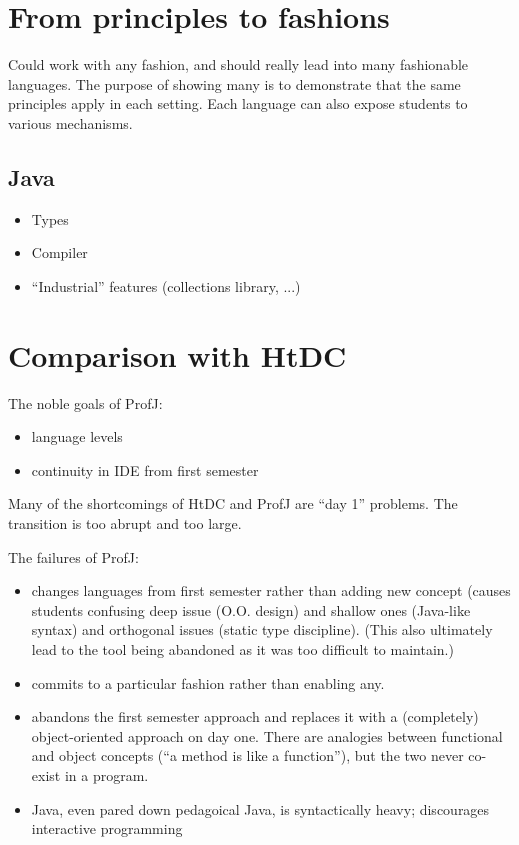 \documentclass[submission,copyright]{eptcs}
\begin{document}
\section{From principles to fashions}

Could work with any fashion, and should really lead into many
fashionable languages.  The purpose of showing many is to demonstrate
that the same principles apply in each setting.  Each language can also
expose students to various mechanisms.

\subsection{Java}

\begin{itemize}
\item Types
\item Compiler
\item ``Industrial'' features (collections library, ...)
\end{itemize}


\section{Comparison with HtDC}

The noble goals of ProfJ:

\begin{itemize}
\item language levels
\item continuity in IDE from first semester
\end{itemize}

Many of the shortcomings of HtDC and ProfJ are ``day 1'' problems.
The transition is too abrupt and too large.

The failures of  ProfJ:

\begin{itemize}
\item changes languages from first semester rather than adding new
  concept (causes students confusing deep issue (O.O. design) and
  shallow ones (Java-like syntax) and orthogonal issues (static type
  discipline).  (This also ultimately lead to the tool being abandoned
  as it was too difficult to maintain.)

\item commits to a particular fashion rather than enabling any.

\item abandons the first semester approach and replaces it with a
  (completely) object-oriented approach on day one.  There are
  analogies between functional and object concepts (``a method is like
  a function''), but the two never co-exist in a program.

\item Java, even pared down pedagoical Java, is syntactically heavy; discourages
  interactive programming

\end{itemize}
\end{document}
